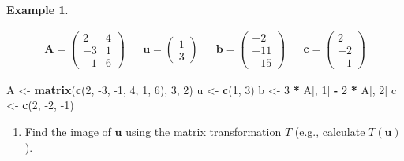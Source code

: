 \documentclass[
]{book}
\newenvironment{Shaded}{\begin{snugshade}}{\end{snugshade}}
\newcommand{\CommentTok}[1]{\textcolor[rgb]{0.56,0.35,0.01}{\textit{#1}}}
\newcommand{\DecValTok}[1]{\textcolor[rgb]{0.00,0.00,0.81}{#1}}
\newcommand{\KeywordTok}[1]{\textcolor[rgb]{0.13,0.29,0.53}{\textbf{#1}}}
\newcommand{\NormalTok}[1]{#1}
\newcommand{\OperatorTok}[1]{\textcolor[rgb]{0.81,0.36,0.00}{\textbf{#1}}}
\newcommand{\StringTok}[1]{\textcolor[rgb]{0.31,0.60,0.02}{#1}}
\providecommand{\tightlist}{%
  \setlength{\itemsep}{0pt}\setlength{\parskip}{0pt}}
\theoremstyle{definition}
\theoremstyle{definition}
\newtheorem{example}{Example}[chapter]
\theoremstyle{definition}
\theoremstyle{remark}
\begin{document}
\begin{example}
\protect\hypertarget{exm:unlabeled-div-69}{}\label{exm:unlabeled-div-69}

\[
\begin{aligned}
\mathbf{A} = \begin{pmatrix}
2 & 4 \\
-3 & 1 \\
-1 & 6
\end{pmatrix}
&& \mathbf{u} = \begin{pmatrix}
1 \\
3
\end{pmatrix}
&& \mathbf{b} = \begin{pmatrix}
-2 \\
-11 \\
-15
\end{pmatrix} &&
\mathbf{c} = \begin{pmatrix}
2 \\
-2 \\
-1
\end{pmatrix}
\end{aligned}
\]

\begin{Shaded}
\begin{Highlighting}[]
\NormalTok{A <-}\StringTok{ }\KeywordTok{matrix}\NormalTok{(}\KeywordTok{c}\NormalTok{(}\DecValTok{2}\NormalTok{, }\DecValTok{-3}\NormalTok{, }\DecValTok{-1}\NormalTok{, }\DecValTok{4}\NormalTok{, }\DecValTok{1}\NormalTok{, }\DecValTok{6}\NormalTok{), }\DecValTok{3}\NormalTok{, }\DecValTok{2}\NormalTok{)}
\NormalTok{u <-}\StringTok{ }\KeywordTok{c}\NormalTok{(}\DecValTok{1}\NormalTok{, }\DecValTok{3}\NormalTok{)}
\NormalTok{b <-}\StringTok{ }\DecValTok{3} \OperatorTok{*}\StringTok{ }\NormalTok{A[, }\DecValTok{1}\NormalTok{] }\OperatorTok{-}\StringTok{ }\DecValTok{2} \OperatorTok{*}\StringTok{ }\NormalTok{A[, }\DecValTok{2}\NormalTok{]}
\NormalTok{c <-}\StringTok{ }\KeywordTok{c}\NormalTok{(}\DecValTok{2}\NormalTok{, }\DecValTok{-2}\NormalTok{, }\DecValTok{-1}\NormalTok{)}
\end{Highlighting}
\end{Shaded}

\begin{enumerate}
\def\labelenumi{\alph{enumi})}
\tightlist
\item
  Find the image of \(\mathbf{u}\) using the matrix transformation \(T\) (e.g., calculate \(T(\mathbf{u})\)).
\end{enumerate}

\begin{Shaded}
\end{Shaded}


\end{example}
\end{document}
